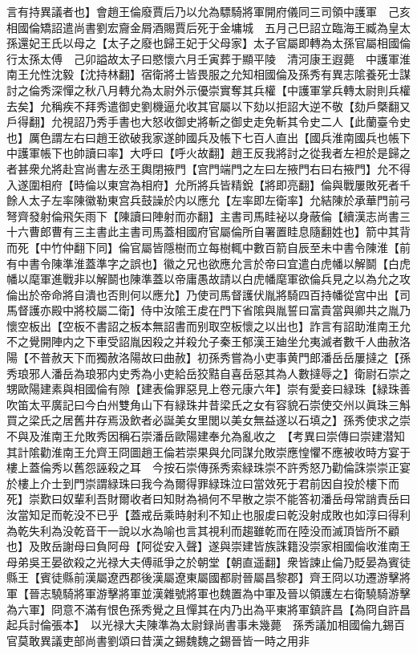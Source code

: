 言有持異議者也】會趙王倫廢賈后乃以允為驃騎將軍開府儀同三司領中護軍　己亥相國倫矯詔遣尚書劉宏齎金屑酒賜賈后死于金墉城　五月己巳詔立臨海王臧為皇太孫還妃王氏以母之【太子之廢也歸王妃于父母家】太子官屬即轉為太孫官屬相國倫行太孫太傅　己卯謚故太子曰愍懷六月壬寅葬于顯平陵　清河康王遐薨　中護軍淮南王允性沈毅【沈持林翻】宿衛將士皆畏服之允知相國倫及孫秀有異志隂養死士謀討之倫秀深憚之秋八月轉允為太尉外示優崇實奪其兵權【中護軍掌兵轉太尉則兵權去矣】允稱疾不拜秀遣御史劉機逼允收其官屬以下劾以拒詔大逆不敬【劾戶槩翻又戶得翻】允視詔乃秀手書也大怒收御史將斬之御史走免斬其令史二人【此蘭臺令史也】厲色謂左右曰趙王欲破我家遂帥國兵及帳下七百人直出【國兵淮南國兵也帳下中護軍帳下也帥讀曰率】大呼曰【呼火故翻】趙王反我將討之從我者左袒於是歸之者甚衆允將赴宫尚書左丞王輿閉掖門【宫門端門之左曰左掖門右曰右掖門】允不得入遂圍相府【時倫以東宫為相府】允所將兵皆精銳【將即亮翻】倫與戰屢敗死者千餘人太子左率陳徽勒東宫兵鼓譟於内以應允【左率即左衛率】允結陳於承華門前弓弩齊發射倫飛矢雨下【陳讀曰陣射而亦翻】主書司馬眭袐以身蔽倫【續漢志尚書三十六曹郎曹有三主書此主書司馬蓋相國府官屬倫所自署置眭息隨翻姓也】箭中其背而死【中竹仲翻下同】倫官屬皆隱樹而立每樹輒中數百箭自辰至未中書令陳淮【前有中書令陳準淮蓋準字之誤也】徽之兄也欲應允言於帝曰宜遣白虎幡以解鬬【白虎幡以麾軍進戰非以解鬬也陳準蓋以帝庸愚故請以白虎幡麾軍欲倫兵見之以為允之攻倫出於帝命將自潰也否則何以應允】乃使司馬督護伏胤將騎四百持幡從宫中出【司馬督護亦殿中將校屬二衛】侍中汝隂王䖍在門下省隂與胤誓曰富貴當與卿共之胤乃懷空板出【空板不書詔之板本無詔書而别取空板懷之以出也】詐言有詔助淮南王允不之覺開陣内之下車受詔胤因殺之并殺允子秦王郁漢王廸坐允夷滅者數千人曲赦洛陽【不普赦天下而獨赦洛陽故曰曲赦】初孫秀嘗為小吏事黄門郎潘岳岳屢撻之【孫秀琅邪人潘岳為琅邪内史秀為小吏給岳狡黠自喜岳惡其為人數撻辱之】衛尉石崇之甥歐陽建素與相國倫有隙【建表倫罪惡見上卷元康六年】崇有愛妾曰緑珠【緑珠善吹笛太平廣記曰今白州雙角山下有緑珠井昔梁氏之女有容貌石崇使交州以眞珠三斛買之梁氏之居舊井存焉汲飲者必誕美女里閭以美女無益遂以石填之】孫秀使求之崇不與及淮南王允敗秀因稱石崇潘岳歐陽建奉允為亂收之　【考異曰崇傳曰崇建潜知其計隂勸淮南王允齊王冏圖趙王倫若崇果與允同謀允敗崇應惶懼不應被收時方宴于樓上蓋倫秀以舊怨誣殺之耳　今按石崇傳孫秀索緑珠崇不許秀怒乃勸倫誅崇崇正宴於樓上介士到門崇謂緑珠曰我今為爾得罪緑珠泣曰當效死于君前因自投於樓下而死】崇歎曰奴輩利吾財爾收者曰知財為禍何不早散之崇不能答初潘岳母常誚責岳曰汝當知足而乾没不已乎【蓋戒岳乘時射利不知止也服䖍曰乾没射成敗也如淳曰得利為乾失利為没乾音干一說以水為喻也言其視利而趨雖乾而在陸没而滅頂皆所不顧也】及敗岳謝母曰負阿母【阿從安入聲】遂與崇建皆族誅籍没崇家相國倫收淮南王母弟吳王晏欲殺之光禄大夫傅祗爭之於朝堂【朝直遥翻】衆皆諫止倫乃貶晏為賓徒縣王【賓徒縣前漢屬遼西郡後漢屬遼東屬國都尉晉屬昌黎郡】齊王冏以功遷游擊將軍【晉志驍騎將軍游擊將軍並漢雜號將軍也魏置為中軍及晉以領護左右衛驍騎游擊為六軍】冏意不滿有恨色孫秀覺之且憚其在内乃出為平東將軍鎮許昌【為冏自許昌起兵討倫張本】　以光禄大夫陳準為太尉録尚書事未幾薨　孫秀議加相國倫九錫百官莫敢異議吏部尚書劉頌曰昔漢之錫魏魏之錫晉皆一時之用非